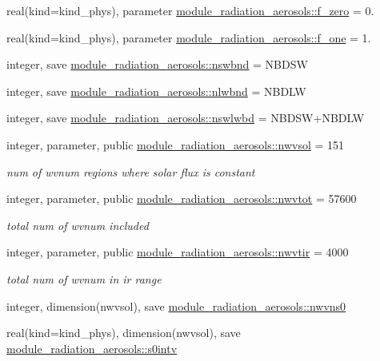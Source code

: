 \begin{DoxyCompactItemize}
real(kind=kind\+\_\+phys), parameter \hyperlink{namespacemodule__radiation__aerosols_a7db1adcf476a9a5532230aa11fcc3bb7}{module\+\_\+radiation\+\_\+aerosols\+::f\+\_\+zero} = 0.
\item 
real(kind=kind\+\_\+phys), parameter \hyperlink{namespacemodule__radiation__aerosols_a63babe7f9ec4ff6a0364993f4be3768e}{module\+\_\+radiation\+\_\+aerosols\+::f\+\_\+one} = 1.
\item 
integer, save \hyperlink{namespacemodule__radiation__aerosols_a1d6c41e3bb818aa8b6f8f10d1c3f38a7}{module\+\_\+radiation\+\_\+aerosols\+::nswbnd} = N\+B\+D\+SW
\item 
integer, save \hyperlink{namespacemodule__radiation__aerosols_ab17b7f75d6d737fd2fc81eae44cba81d}{module\+\_\+radiation\+\_\+aerosols\+::nlwbnd} = N\+B\+D\+LW
\item 
integer, save \hyperlink{namespacemodule__radiation__aerosols_ab77b3b4aa76361277d828c7ba5dc3eda}{module\+\_\+radiation\+\_\+aerosols\+::nswlwbd} = N\+B\+D\+SW+N\+B\+D\+LW
\item 
integer, parameter, public \hyperlink{namespacemodule__radiation__aerosols_a2e0dc6d161d1906050efd67c471673c9}{module\+\_\+radiation\+\_\+aerosols\+::nwvsol} = 151
\begin{DoxyCompactList}\small\item\em num of wvnum regions where solar flux is constant \end{DoxyCompactList}\item 
integer, parameter, public \hyperlink{namespacemodule__radiation__aerosols_ae94df49c8ff8c0ec8e6b8adb891f3c6b}{module\+\_\+radiation\+\_\+aerosols\+::nwvtot} = 57600
\begin{DoxyCompactList}\small\item\em total num of wvnum included \end{DoxyCompactList}\item 
integer, parameter, public \hyperlink{namespacemodule__radiation__aerosols_a45b2c26ccba5d4fd2dfccf31bcc02824}{module\+\_\+radiation\+\_\+aerosols\+::nwvtir} = 4000
\begin{DoxyCompactList}\small\item\em total num of wvnum in ir range \end{DoxyCompactList}\item 
integer, dimension(nwvsol), save \hyperlink{namespacemodule__radiation__aerosols_a80194c8356dfb92a43306abbe7097711}{module\+\_\+radiation\+\_\+aerosols\+::nwvns0}
\item 
real(kind=kind\+\_\+phys), dimension(nwvsol), save \hyperlink{namespacemodule__radiation__aerosols_aed8bb8a8bc26d72a6c3d31ed4430941f}{module\+\_\+radiation\+\_\+aerosols\+::s0intv}

\end{DoxyCompactItemize}
